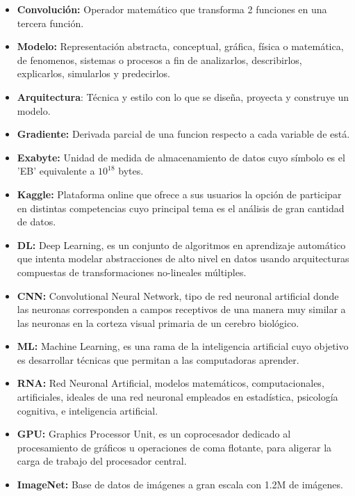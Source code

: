 \begin{itemize}
\item \textbf{Convolución:} Operador matemático que transforma 2 funciones en una tercera función.
\item \textbf{Modelo:} Representación abstracta, conceptual, gráfica, física o matemática, de
fenomenos, sistemas o procesos a fin de analizarlos, describirlos, explicarlos, simularlos
y predecirlos.
\item \textbf{Arquitectura}: Técnica y estilo con lo que se diseña, proyecta y construye un modelo.
\item 
\textbf{Gradiente:} Derivada parcial de una funcion respecto a cada variable de está.

\item \textbf{Exabyte:} Unidad de medida de almacenamiento de datos cuyo símbolo es el 'EB' equivalente a $10^18$ bytes.

\item \textbf{Kaggle:} Plataforma online que ofrece a sus usuarios la opción de participar en distintas
competencias cuyo principal tema es el análisis de gran cantidad de datos.


\item \textbf{DL:} Deep Learning, es un conjunto de algoritmos en aprendizaje automático que intenta
modelar abstracciones de alto nivel en datos usando arquitecturas compuestas de
transformaciones no-lineales múltiples.



\item \textbf{CNN:} Convolutional Neural Network, tipo de red neuronal artificial donde las neuronas
corresponden a campos receptivos de una manera muy similar a las neuronas en la corteza
visual primaria de un cerebro biológico.

\item \textbf{ML:} Machine Learning, es una rama de la inteligencia artificial cuyo objetivo es
desarrollar técnicas que permitan a las computadoras aprender.


\item \textbf{RNA:} Red Neuronal Artificial, modelos matemáticos, computacionales, artificiales,
ideales de una red neuronal empleados en estadística, psicología cognitiva, e inteligencia
artificial.


\item \textbf{GPU:} Graphics Processor Unit, es un coprocesador dedicado al procesamiento de
gráficos u operaciones de coma flotante, para aligerar la carga de trabajo del procesador
central.

\item \textbf{ImageNet:} Base de datos de imágenes a gran escala con 1.2M de imágenes.


\end{itemize}